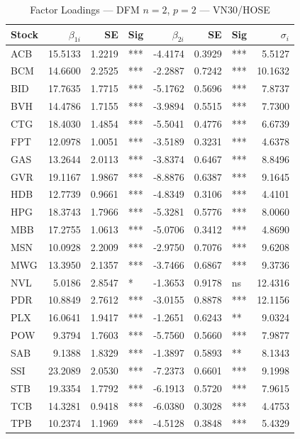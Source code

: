 \begin{table}[h]\centering
\caption{Factor Loadings — DFM $n=2$, $p=2$ — VN30/HOSE}
\begin{tabular}{lrrlrrl r}\toprule
Stock & $\beta_{1i}$ & SE & Sig & $\beta_{2i}$ & SE & Sig & $\sigma_i$ \\
\midrule
ACB & 15.5133 & 1.2219 & *** & -4.4174 & 0.3929 & *** & 5.5127 \\
BCM & 14.6600 & 2.2525 & *** & -2.2887 & 0.7242 & *** & 10.1632 \\
BID & 17.7635 & 1.7715 & *** & -5.1762 & 0.5696 & *** & 7.8737 \\
BVH & 14.4786 & 1.7155 & *** & -3.9894 & 0.5515 & *** & 7.7300 \\
CTG & 18.4030 & 1.4854 & *** & -5.5041 & 0.4776 & *** & 6.6739 \\
FPT & 12.0978 & 1.0051 & *** & -3.5189 & 0.3231 & *** & 4.6378 \\
GAS & 13.2644 & 2.0113 & *** & -3.8374 & 0.6467 & *** & 8.8496 \\
GVR & 19.1167 & 1.9867 & *** & -8.8876 & 0.6387 & *** & 9.1645 \\
HDB & 12.7739 & 0.9661 & *** & -4.8349 & 0.3106 & *** & 4.4101 \\
HPG & 18.3743 & 1.7966 & *** & -5.3281 & 0.5776 & *** & 8.0060 \\
MBB & 17.2755 & 1.0613 & *** & -5.0706 & 0.3412 & *** & 4.8690 \\
MSN & 10.0928 & 2.2009 & *** & -2.9750 & 0.7076 & *** & 9.6208 \\
MWG & 13.3950 & 2.1357 & *** & -3.7466 & 0.6867 & *** & 9.3736 \\
NVL & 5.0186 & 2.8547 & * & -1.3653 & 0.9178 & ns & 12.4316 \\
PDR & 10.8849 & 2.7612 & *** & -3.0155 & 0.8878 & *** & 12.1156 \\
PLX & 16.0641 & 1.9417 & *** & -1.2651 & 0.6243 & ** & 9.0324 \\
POW & 9.3794 & 1.7603 & *** & -5.7560 & 0.5660 & *** & 7.9877 \\
SAB & 9.1388 & 1.8329 & *** & -1.3897 & 0.5893 & ** & 8.1343 \\
SSI & 23.2089 & 2.0530 & *** & -7.2373 & 0.6601 & *** & 9.1998 \\
STB & 19.3354 & 1.7792 & *** & -6.1913 & 0.5720 & *** & 7.9615 \\
TCB & 14.3281 & 0.9418 & *** & -6.0380 & 0.3028 & *** & 4.4753 \\
TPB & 10.2374 & 1.1969 & *** & -4.5128 & 0.3848 & *** & 5.4329 \\

\end{tabular}
\end{table}
